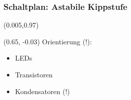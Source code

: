 \documentclass[aspectratio=169, 14pt]{beamer}
\begin{document}
\begin{frame}
    \frametitle{Schaltplan: Astabile Kippstufe}
    \begin{textblock*}{1.0\paperwidth}(0.005\paperwidth,0.97\paperheight)
    \end{textblock*}
    \begin{textblock*}{2\paperwidth}(0.65\paperwidth, -0.03\paperheight)
        \vspace*{3.0cm}
        Orientierung (!):
        \begin{itemize}
            \setlength\itemsep{5pt}
            \item LEDs
            \item Transistoren
            \item Kondensatoren (!)
        \end{itemize}
    \end{textblock*}
    \framenumber
\end{frame}
\end{document}
